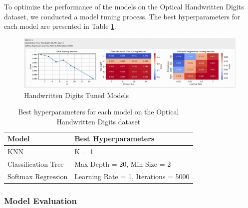 \documentclass[letterpaper,10pt]{article}
\begin{document}
To optimize the performance of the models on the Optical Handwritten Digits dataset, we conducted a model tuning process. The best hyperparameters for each model are presented in Table \ref{tab:digits_tuning}.
\begin{figure}[ht]
    \centering
    \includegraphics[width=1.0\textwidth]{pendigits_tuned.png}
    \caption{Handwritten Digits Tuned Models}
    \label{pendigits_tuned}
\end{figure}
\begin{table}[ht]
\centering
\caption{Best hyperparameters for each model on the Optical Handwritten Digits dataset}
\label{tab:digits_tuning}
\begin{tabular}{|l|l|}
\hline
\textbf{Model} & \textbf{Best Hyperparameters} \\
\hline
KNN & K = 1 \\
\hline
Classification Tree & Max Depth = 20, Min Size = 2 \\
\hline
Softmax Regression & Learning Rate = 1, Iterations = 5000 \\
\hline
\end{tabular}
\end{table}

\subsubsection{Model Evaluation}
\end{document}
